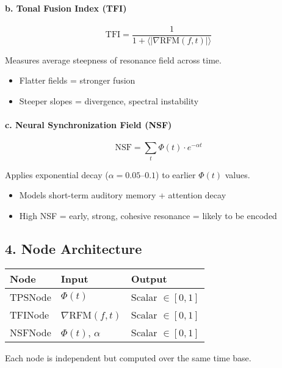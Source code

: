 \paragraph{b. Tonal Fusion Index (TFI)}

\[
\text{TFI} = \frac{1}{1 + \langle |\nabla \text{RFM}(f, t)| \rangle}
\]

Measures average steepness of resonance field across time.

\begin{itemize}
    \item Flatter fields = stronger fusion
    \item Steeper slopes = divergence, spectral instability
\end{itemize}

\paragraph{c. Neural Synchronization Field (NSF)}

\[
\text{NSF} = \sum_t \Phi(t) \cdot e^{-\alpha t}
\]

Applies exponential decay ($\alpha = 0.05$–$0.1$) to earlier $\Phi(t)$ values.

\begin{itemize}
    \item Models short-term auditory memory + attention decay
    \item High NSF = early, strong, cohesive resonance = likely to be encoded
\end{itemize}

\subsection*{4. Node Architecture}

\begin{center}
\begin{tabular}{|l|l|l|}
\hline
\textbf{Node} & \textbf{Input} & \textbf{Output} \\
\hline
TPSNode & $\Phi(t)$ & Scalar $\in [0, 1]$ \\
TFINode & $\nabla$RFM$(f, t)$ & Scalar $\in [0, 1]$ \\
NSFNode & $\Phi(t)$, $\alpha$ & Scalar $\in [0, 1]$ \\
\hline
\end{tabular}
\end{center}

Each node is independent but computed over the same time base.

